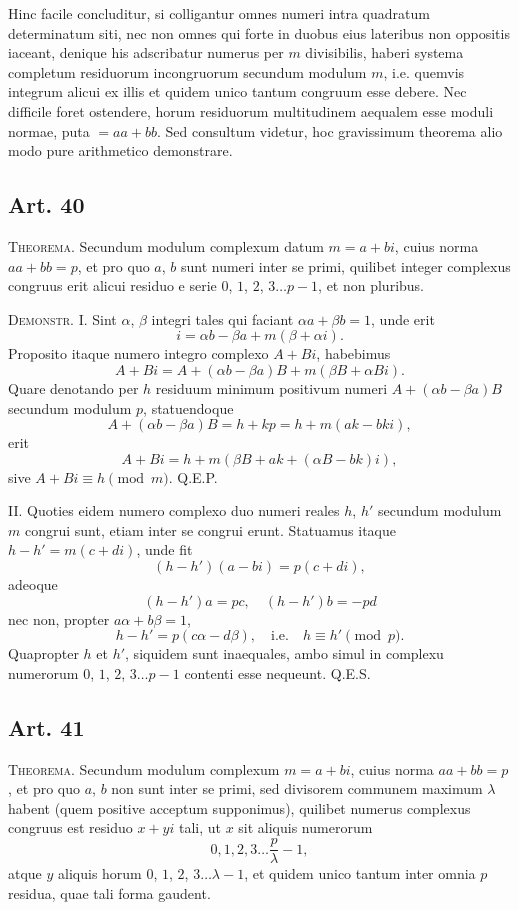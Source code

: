 \documentclass[12pt]{article}
\newcommand{\art}[1]{\subsection*{Art. #1}}
\begin{document}
Hinc facile concluditur, si colligantur omnes numeri intra quadratum determinatum siti, nec non omnes qui forte in duobus eius lateribus non oppositis iaceant, denique his adscribatur numerus per $m$ divisibilis, haberi systema completum residuorum incongruorum secundum modulum $m$, i.e. quemvis integrum alicui ex illis et quidem unico tantum congruum esse debere. Nec difficile foret ostendere, horum residuorum multitudinem aequalem esse moduli normae, puta $=aa+bb$. Sed consultum videtur, hoc gravissimum theorema alio modo pure arithmetico demonstrare.

\art{40}

\noindent\textsc{Theorema.} Secundum modulum complexum datum $m=a+bi$, cuius norma $aa+bb=p$, et pro quo $a$, $b$ sunt numeri inter se primi, quilibet integer complexus congruus erit alicui residuo e serie $0$, $1$, $2$, $3\ldots p-1$, et non pluribus.

\medskip
\noindent\textsc{Demonstr.} I. Sint $\alpha$, $\beta$ integri tales qui faciant $\alpha a+\beta b=1$, unde erit
\[
i=\alpha b-\beta a+m(\beta+\alpha i).
\]
Proposito itaque numero integro complexo $A+Bi$, habebimus
\[
A+Bi=A+(\alpha b-\beta a)B+m(\beta B+\alpha B i).
\]
Quare denotando per $h$ residuum minimum positivum numeri $A+(\alpha b-\beta a)B$ secundum modulum $p$, statuendoque
\[
A+(\alpha b-\beta a)B=h+kp=h+m(ak-bki),
\]
erit
\[
A+Bi=h+m(\beta B+ak+(\alpha B-bk)i),
\]
sive $A+Bi\equiv h \pmod{m}$. Q.E.P.

II. Quoties eidem numero complexo duo numeri reales $h$, $h'$ secundum modulum $m$ congrui sunt, etiam inter se congrui erunt. Statuamus itaque $h-h'=m(c+di)$, unde fit
\[
(h-h')(a-bi)=p(c+di),
\]
adeoque
\[
(h-h')a=pc,\quad (h-h')b=-pd
\]
nec non, propter $a\alpha+b\beta=1$,
\[
h-h'=p(c\alpha-d\beta),\quad \text{i.e.}\quad h\equiv h' \pmod{p}.
\]
Quapropter $h$ et $h'$, siquidem sunt inaequales, ambo simul in complexu numerorum $0$, $1$, $2$, $3\ldots p-1$ contenti esse nequeunt. Q.E.S.

\art{41}

\noindent\textsc{Theorema.} Secundum modulum complexum $m=a+bi$, cuius norma $aa+bb=p$, et pro quo $a$, $b$ non sunt inter se primi, sed divisorem communem maximum $\lambda$ habent (quem positive acceptum supponimus), quilibet numerus complexus congruus est residuo $x+yi$ tali, ut $x$ sit aliquis numerorum
\[
0,1,2,3\ldots \frac{p}{\lambda}-1,
\]
atque $y$ aliquis horum $0$, $1$, $2$, $3\ldots \lambda-1$, et quidem unico tantum inter omnia $p$ residua, quae tali forma gaudent.
\end{document}
